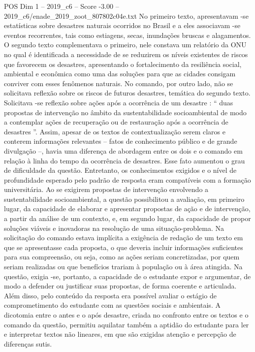 \begin{textsample}{POS Dim 1 – 2019\_c6 – Score -3.00 – 2019\_c6/enade\_2019\_zoot\_807802c04e.txt}
No primeiro texto, apresentavam -se estatísticas sobre desastres naturais ocorridos no Brasil e a eles associavam -se eventos recorrentes, tais como estiagens, secas, inundações bruscas e alagamentos.
O segundo texto complementava o primeiro, nele constava um relatório da ONU no qual é identificada a necessidade de se reduzirem os níveis existentes de riscos que favorecem os desastres, apresentando o fortalecimento da resiliência social, ambiental e econômica como uma das soluções para que as cidades consigam conviver com esses fenômenos naturais.
No comando, por outro lado, não se solicitava reflexão sobre os riscos de futuros desastres, temática do segundo texto.
Solicitava -se reflexão sobre ações após a ocorrência de um desastre : “ duas propostas de intervenção no âmbito da sustentabilidade socioambiental de modo a contemplar ações de recuperação ou de restauração após a ocorrência de desastres ”.
Assim, apesar de os textos de contextualização serem claros e conterem informações relevantes – fatos de conhecimento público e de grande divulgação –, havia uma diferença de abordagem entre os dois e o comando em relação à linha do tempo da ocorrência de desastres.
Esse fato aumentou o grau de dificuldade da questão.
Entretanto, os conhecimentos exigidos e o nível de profundidade esperado pelo padrão de resposta eram compatíveis com a formação universitária.
Ao se exigirem propostas de intervenção envolvendo a sustentabilidade socioambiental, a questão possibilitou a avaliação, em primeiro lugar, da capacidade de elaborar e apresentar propostas de ação e de intervenção, a partir da análise de um contexto, e, em segundo lugar, da capacidade de propor soluções viáveis e inovadoras na resolução de uma situação-problema.
Na solicitação do comando estava implícita a exigência de redação de um texto em que se apresentasse cada proposta, o que deveria incluir informações suficientes para sua compreensão, ou seja, como as ações seriam concretizadas, por quem seriam realizadas ou que benefícios trariam à população ou à área atingida.
Na questão, exigia -se, portanto, a capacidade de o estudante expor e argumentar, de modo a defender ou justificar suas propostas, de forma coerente e articulada.
Além disso, pelo conteúdo da resposta era possível avaliar o estágio de comprometimento do estudante com as questões sociais e ambientais.
A dicotomia entre o antes e o após desastre, criada no confronto entre os textos e o comando da questão, permitiu aquilatar também a aptidão do estudante para ler e interpretar textos não lineares, em que são exigidas atenção e percepção de diferenças sutis.

\end{textsample}
